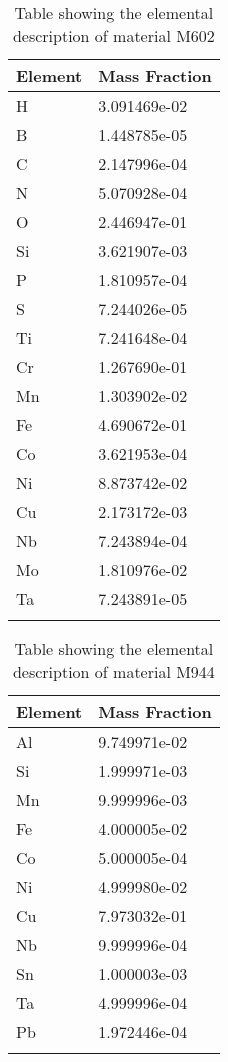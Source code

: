 \begin{centering}
\begin{longtable}[ht!]
\caption{Table showing the elemental description of material M603}
\label{table:material_M603}
\end{longtable}
\clearpage

\begin{longtable}[ht!]
{ p{} | p{} }
\hline
Element & Mass Fraction\\
\hline
H &  3.091469e-02\\
B &  1.448785e-05\\
C &  2.147996e-04\\
N &  5.070928e-04\\
O &  2.446947e-01\\
Si &  3.621907e-03\\
P &  1.810957e-04\\
S &  7.244026e-05\\
Ti &  7.241648e-04\\
Cr &  1.267690e-01\\
Mn &  1.303902e-02\\
Fe &  4.690672e-01\\
Co &  3.621953e-04\\
Ni &  8.873742e-02\\
Cu &  2.173172e-03\\
Nb &  7.243894e-04\\
Mo &  1.810976e-02\\
Ta &  7.243891e-05\\

\caption{Table showing the elemental description of material M602}
\label{table:material_M602}
\end{longtable}
\clearpage

\begin{longtable}[ht!]
{ p{} | p{} }
\hline
Element & Mass Fraction\\
\hline
Al &  9.749971e-02\\
Si &  1.999971e-03\\
Mn &  9.999996e-03\\
Fe &  4.000005e-02\\
Co &  5.000005e-04\\
Ni &  4.999980e-02\\
Cu &  7.973032e-01\\
Nb &  9.999996e-04\\
Sn &  1.000003e-03\\
Ta &  4.999996e-04\\
Pb &  1.972446e-04\\
\caption{Table showing the elemental description of material M944}
\label{table:material_EPPDRW}
\end{longtable}
\clearpage


\end{centering}
